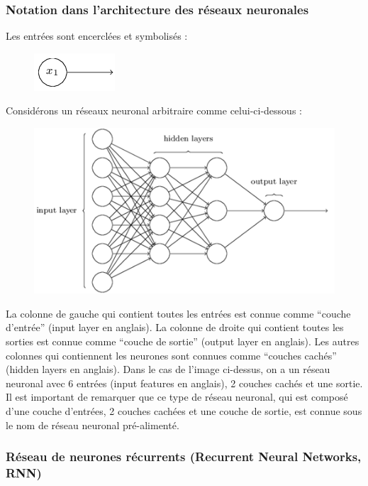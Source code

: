 \documentclass[conference,onecolumn]{IEEEtran}
\begin{document}
\subsubsection{Notation dans l’architecture des réseaux neuronales}
Les entrées sont encerclées et symbolisés : 

 \begin{figure}[H]
 \centering
    \includegraphics[scale=0.5]{img12.png}
\end{figure}

Considérons un réseaux neuronal arbitraire comme celui-ci-dessous : 

 \begin{figure}[H]
 \centering
    \includegraphics[scale=0.7]{img13.png}
\end{figure}


La colonne de gauche qui contient toutes les entrées est connue comme “couche d’entrée” (input layer en anglais). La colonne de droite qui contient toutes les sorties est connue comme “couche de sortie” (output layer en anglais). Les autres colonnes qui contiennent les neurones sont connues comme “couches cachés” (hidden layers en anglais). Dans le cas de l’image ci-dessus, on a un réseau neuronal avec 6 entrées (input features en anglais), 2 couches cachés et une sortie.  Il est important de remarquer que ce type de réseau neuronal, qui est composé d’une couche d’entrées, 2 couches cachées et une couche de sortie, est connue sous le nom de réseau neuronal pré-alimenté.
\hfill\\

\subsubsection{Réseau de neurones récurrents (Recurrent Neural Networks, RNN)}
\end{document}
